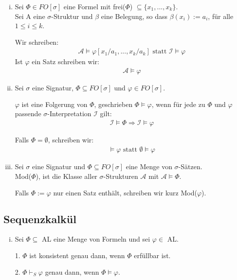\documentclass[a4paper,10pt]{article}
\begin{document}
\begin{enumerate}[(i)]
				
			\item	
				Sei $\Phi \in FO[\sigma]$ eine Formel mit frei($\Phi$) $\subseteq \{x_1,..., x_k\}$. \\
				
				Sei A eine $\sigma$-Struktur und $\beta$ eine Belegung, so dass $\beta(x_i) := a_i$, für alle $1 \leq i \leq k$.
				
				Wir schreiben:
				\begin{align*}
					\mathcal{A} \vDash \varphi[x_1/a_1,..., x_k/a_k] \text{ statt } \mathcal{I} \vDash \varphi
				\end{align*}
				Ist $\varphi$ ein Satz schreiben wir:
				\begin{align*}
					\mathcal{A} \vDash \varphi
				\end{align*}
			
			\item
				Sei $\sigma$ eine Signatur, $\Phi \subseteq FO[\sigma]$ und $\varphi \in FO[\sigma]$.
				
				$\varphi$ ist eine Folgerung von $\Phi$, geschrieben $\Phi \vDash \varphi$, wenn für jede zu $\Phi$ und $\varphi$ passende 							$\sigma$-Interpretation $\mathcal{I}$ gilt:
				\begin{align*}
					\mathcal{I} \vDash \Phi \Rightarrow \mathcal{I} \vDash \varphi
				\end{align*}
				
				Falls $\Phi = \emptyset$, schreiben wir:
				\begin{align*}
					\vDash \varphi \text{ statt } \emptyset \vDash \varphi
				\end{align*}
		
			\item
				Sei $\sigma$ eine Signatur und $\Phi \subseteq FO[\sigma]$ eine Menge von $\sigma$-Sätzen.\\
				
				Mod($\Phi$), ist die Klasse aller $\sigma$-Strukturen $\mathcal{A}$ mit $\mathcal{A} \vDash \Phi$.
				
				Falls $\Phi := {\varphi}$ nur einen Satz enthält, schreiben wir kurz Mod($\varphi$).
		\end{enumerate}
		
	\subsection*{Sequenzkalkül}
		\begin{enumerate}[(i)]
			\item
				Sei $\Phi \subseteq$ AL eine Menge von Formeln und sei $\varphi \in$ AL.
				
				1. $\Phi$ ist konsistent genau dann, wenn $\Phi$ erfüllbar ist.
				
				2. $\Phi \vdash_S \varphi$ genau dann, wenn $\Phi \vDash \varphi$.
		\end{enumerate}
\end{document}
